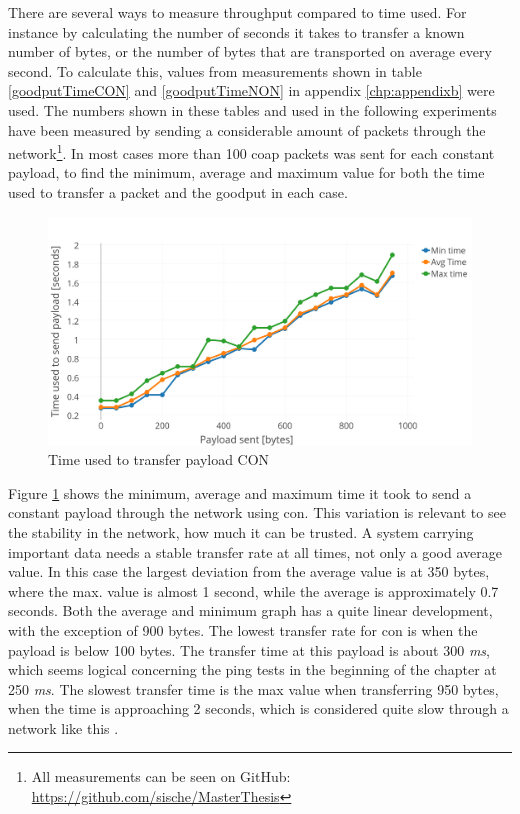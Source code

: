 \noindent There are several ways to measure throughput compared to time used. For instance by calculating the number of seconds it takes to transfer a known number of bytes, or the number of bytes that are transported on average every second. To calculate this, values from measurements shown in table \ref{goodputTimeCON} and \ref{goodputTimeNON} in appendix \ref{chp:appendixb} were used. The numbers shown in these tables and used in the following experiments have been measured by sending a considerable amount of packets through the network\footnote{All measurements can be seen on GitHub: \url{https://github.com/sische/MasterThesis}}. In most cases more than 100 \gls{coap} packets was sent for each constant payload, to find the minimum, average and maximum value for both the time used to transfer a packet and the \gls{goodput} in each case. 

\begin{figure}[h!]
    \centering
    \includegraphics[width=1.0\textwidth]{bytesPrSecondNew3.png}    
    \caption{Time used to transfer payload CON}
    \label{fig:bytesPRSecond3}
\end{figure}


\noindent Figure \ref{fig:bytesPRSecond3} shows the minimum, average and maximum time it took to send a constant payload through the network using \gls{con}. This variation is relevant to see the stability in the network, how much it can be trusted. A system carrying important data needs a stable transfer rate at all times, not only a good average value. In this case the largest deviation from the average value is at 350 bytes, where the max. value is almost 1 second, while the average is approximately 0.7 seconds. Both the average and minimum graph has a quite linear development, with the exception of 900 bytes. The lowest transfer rate for \gls{con} is when the payload is below 100 bytes. The transfer time at this payload is about 300 \textit{ms}, which seems logical concerning the ping tests in the beginning of the chapter at 250 \textit{ms}. The slowest transfer time is the max value when transferring 950 bytes, when the time is approaching 2 seconds, which is considered quite slow through a network like this . 

